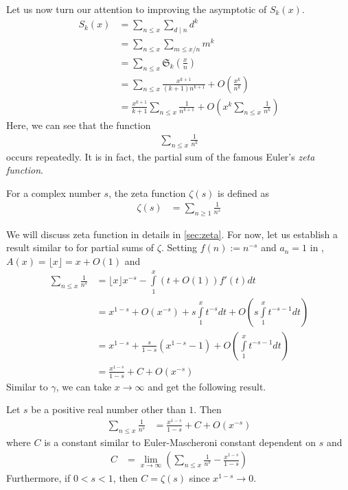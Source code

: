 \documentclass[elemannt.tex]{subfile}
\begin{document}
	Let us now turn our attention to improving the asymptotic of $S_{k}(x)$.
		\begin{align*}
			S_{k}(x)
				& = \sum_{n\leq x}\sum_{d\mid n}d^{k}\\
				& = \sum_{n\leq x}\sum_{m\leq x/n}m^{k}\\
				& = \sum_{n\leq x}\mathfrak{S}_{k}\left(\frac{x}{n}\right)\\
				& = \sum_{n\leq x}\frac{x^{k+1}}{(k+1)n^{k+1}}+O\left(\frac{x^{k}}{n^{k}}\right)\\
				& = \frac{x^{k+1}}{k+1}\sum_{n\leq x}\frac{1}{n^{k+1}}+O\left(x^{k}\sum_{n\leq x}\frac{1}{n^{k}}\right)
		\end{align*}
	Here, we can see that the function
		\begin{align*}
			\sum_{n\leq x}\frac{1}{n^{k}}
		\end{align*}
	occurs repeatedly. It is in fact, the partial sum of the famous Euler's \textit{zeta function}.
		\begin{definition}
			For a complex number $s$, the zeta function $\zeta(s)$ is defined as
				\begin{align*}
					\zeta(s)
						& = \sum_{n\geq 1}\frac{1}{n^{s}}
				\end{align*}
		\end{definition}
	We will discuss zeta function in details in \autoref{sec:zeta}. For now, let us establish a result similar to  for partial sums of $\zeta$. Setting $f(n):=n^{-s}$ and $a_{n}=1$ in , $A(x)=\lfloor{x}\rfloor=x+O(1)$ and
		\begin{align*}
			\sum_{n\leq x}\frac{1}{n^{s}}
				& = \lfloor{x}\rfloor x^{-s}-\int\limits_{1}^{x}(t+O(1))f'(t)dt\\
				& = x^{1-s}+O\left(x^{-s}\right)+s\int\limits_{1}^{x}t^{-s}dt+O\left(s\int\limits_{1}^{x}t^{-s-1}dt\right)\\
				& = x^{1-s}+\frac{s}{1-s}\left(x^{1-s}-1\right)+O\left(\int\limits_{1}^{x}t^{-s-1}dt\right)\\
				& = \frac{x^{1-s}}{1-s}+C+O(x^{-s})
		\end{align*}
	Similar to $\gamma$, we can take $x\to\infty$ and get the following result.
		\begin{theorem}
			Let $s$ be a positive real number other than $1$. Then
				\begin{align*}
					\sum_{n\leq x}\frac{1}{n^{s}}
						& = \frac{x^{1-s}}{1-s}+C+O(x^{-s})
				\end{align*}
			where $C$ is a constant similar to Euler-Mascheroni constant dependent on $s$ and
				\begin{align*}
					C
						& = \lim\limits_{x\to\infty}\left(\sum_{n\leq x}\frac{1}{n^{s}}-\frac{x^{1-s}}{1-s}\right)
				\end{align*}
			Furthermore, if $0<s<1$, then $C=\zeta(s)$ since $x^{1-s}\to 0$.
		\end{theorem}
\end{document}
